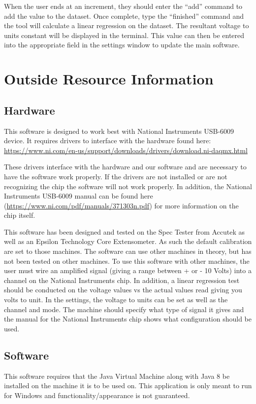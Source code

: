 \documentclass[12pt,letterpaper, USenglish]{article}
\theoremstyle{definition}
\numberwithin{theorem}{section}
\numberwithin{lemma}{section}
\numberwithin{corollary}{section}
\numberwithin{definition}{section}
\numberwithin{example}{section}
\numberwithin{equation}{theorem}
\begin{document}
When the user ends at an increment, they should enter the ``add'' command to add the value to the dataset. Once complete, type the ``finished'' command and the tool will calculate a linear regression on the dataset. The resultant voltage to units constant will be displayed in the terminal. This value can then be entered into the appropriate field in the settings window to update the main software.

\section{Outside Resource Information} \label{resourceSection}

\subsection{Hardware}
This software is designed to work best with National Instruments USB-6009 device. It requires drivers to interface with the hardware found here:
\url{https://www.ni.com/en-us/support/downloads/drivers/download.ni-daqmx.html}

These drivers interface with the hardware and our software and are necessary to have the software work properly. If the drivers are not installed or are not recognizing the chip the software will not work properly. In addition, the National Instruments USB-6009 manual can be found here (\url{https://www.ni.com/pdf/manuals/371303n.pdf}) for more information on the chip itself. 

This software has been designed and tested on the Spec Tester from Accutek as well as an Epsilon Technology Core Extensometer. As such the default calibration are set to those machines. The software can use other machines in theory, but has not been tested on other machines. To use this software with other machines, the user must wire an amplified signal (giving a range between + or - 10 Volts) into a channel on the National Instruments chip. In addition, a linear regression test should be conducted on the voltage values vs the actual values read giving you volts to unit. In the settings, the voltage to units can be set as well as the channel and mode. The machine should specify what type of signal it gives and the manual for the National Instruments chip shows what configuration should be used.  

\subsection{Software}
This software requires that the Java Virtual Machine along with Java 8 be installed on the machine it is to be used on. This application is only meant to run for Windows and functionality/appearance is not guaranteed.
\end{document}
